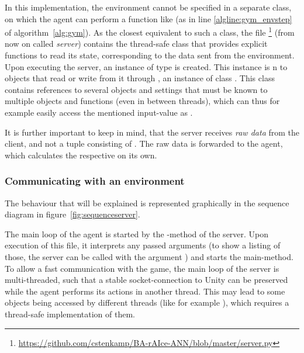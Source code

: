 In this implementation, the environment cannot be specified in a separate class, on which the agent can perform a function like  (as in line \ref{algline:gym_envstep} of algorithm~\ref{alg:gym}). As the closest equivalent to such a class, the file  \footnote{\url{https://github.com/cstenkamp/BA-rAIce-ANN/blob/master/server.py}} (from now on called \textit{server}) contains the thread-safe class  that provides explicit functions to read its state, corresponding to the data sent from the environment. Upon executing the server, an instance  of type  is created. This instance is n to objects that read or write from it through , an instance of class . This class contains references to several objects and settings that must be known to multiple objects and functions (even in between threads), which can thus for example easily access the mentioned input-value as .

It is further important to keep in mind, that the server receives \textit{raw data} from the client, and not a tuple consisting of . The raw data is forwarded to the agent, which calculates the respective  on its own. 

\subsubsection{Communicating with an environment}

The behaviour that will be explained is represented graphically in the sequence diagram in figure~\ref{fig:sequenceserver}. 

The main loop of the agent is started by the -method of the server. Upon execution of this file, it interprets any passed arguments (to show a listing of those, the server can be called with the argument ) and starts the main-method. %
To allow a fast communication with the game, the main loop of the server is multi-threaded, such that a stable socket-connection to Unity can be preserved while the agent performs its actions in another thread. This may lead to some objects being accessed by different threads (like for example ), which requires a thread-safe implementation of them.

